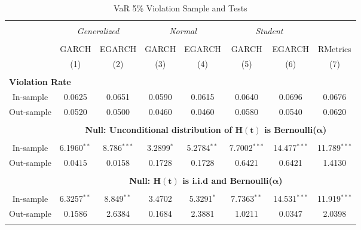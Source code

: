 \documentclass[a4paper]{article}
\begin{document}
\begin{table}[H] \centering 
  \caption{VaR 5\% Violation Sample and Tests} 
  \label{tab:var} %
\begin{tabular}{@{\extracolsep{5pt}}cccccccc} 
\\[-1.8ex]\hline 
\hline \\[-1.8ex] 
& \multicolumn{2}{c}{\textit{Generalized}} & \multicolumn{2}{c}{\textit{Normal}} & \multicolumn{2}{c}{\textit{Student}} \\ 
\cline{2-7}
\\[-1.8ex] & GARCH & EGARCH & GARCH & EGARCH & GARCH & EGARCH & RMetrics \\ 
 & (1) & (2) & (3) & (4) & (5) & (6) & (7) \\ 
\hline \\[-1.8ex] 
\multicolumn{3}{l}{\textbf{Violation Rate }}& \\[1.8ex]
In-sample & 0.0625 & 0.0651 & 0.0590 & 0.0615 & 0.0640 & 0.0696 & 0.0676 \\ 
Out-sample & 0.0520 & 0.0500 & 0.0460 & 0.0460 & 0.0580 & 0.0540 & 0.0620 \\ [1.8ex]
\hline \\[-1.8ex] 

&\multicolumn{7}{c}{\textbf{Null: Unconditional distribution of $\mathbf{H(t)}$ is Bernoulli($\mathbf{\alpha}$)}} \\
\hline \\[-1.8ex]
In-sample & 6.1960$^{**}$ & 8.786$^{***}$ & 3.2899$^{*}$ & 5.2784$^{**}$ & 7.7002$^{***}$ & 14.477$^{***}$ & 11.789$^{***}$\\ 
Out-sample & $0.0415$ & 0.0158 & 0.1728 & 0.1728 & 0.6421 & 0.6421 & 1.4130  \\ [1.8ex]
\hline \\[-1.8ex]

&\multicolumn{7}{c}{\textbf{Null: $\mathbf{H(t)}$ is i.i.d and Bernoulli($\mathbf{\alpha}$)}} \\
\hline \\[-1.8ex] 
In-sample & 6.3257$^{**}$ & 8.849$^{**}$ & 3.4702 & 5.3291$^{*}$ & 7.7363$^{**}$ & 14.531$^{***}$ & 11.919$^{***}$\\ 
Out-sample & $0.1586$ & 2.6384 & 0.1684 & 2.3881 & 1.0211 & 0.0347 & 2.0398\\ [1.8ex]
\hline \\[-1.8ex]


\end{tabular}
\end{table}
\end{document}
